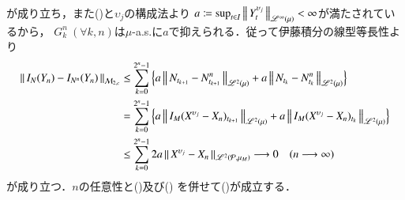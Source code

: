 \begin{prf}
\begin{description}
\begin{align}
				\end{align}
				が成り立ち，また()と$\upsilon_j$の構成法より
				$a \coloneqq \operatorname*{sup}_{t \in I} \left\|\, Y^{\upsilon_j}_t\, \right\|_{\mathscr{L}^{\infty} \left(\mu\right)} < \infty$が満たされているから，
				$G^n_k\ (\forall k,n)$は$\mu$-a.s.に$a$で抑えられる．従って伊藤積分の線型等長性より
				\begin{align}
					\left\|\, I_{N} (Y_n) - I_{N^n} (Y_n)\, \right\|_{\mathcal{M}_{2,c}}
					&\leq \sum_{k=0}^{2^n-1} \left\{ a\left\|\, N_{t_{k+1}} - N^n_{t_{k+1}}\, \right\|_{\mathscr{L}^{2} \left(\mu\right)} + a\left\|\, N_{t_k} - N^n_{t_k}\, \right\|_{\mathscr{L}^{2} \left(\mu\right)} \right\} \\
					&= \sum_{k=0}^{2^n-1} \left\{ a\left\|\, I_M(X^{\upsilon_j} - X_n)_{t_{k+1}}\, \right\|_{\mathscr{L}^{2} \left(\mu\right)} + a\left\|\, I_M(X^{\upsilon_j} - X_n)_{t_k}\, \right\|_{\mathscr{L}^{2} \left(\mu\right)} \right\} \\
					&\leq \sum_{k=0}^{2^n-1} 2a \left\|\, X^{\upsilon_j} - X_n\, \right\|_{\mathscr{L}^{2} \left(\mathcal{P},\mu_M\right)}
					\longrightarrow 0 \quad (n \longrightarrow \infty)
				\end{align}
				が成り立つ．$n$の任意性と()及び()
				を併せて()が成立する．
				\QED
		\end{description}
	\end{prf}